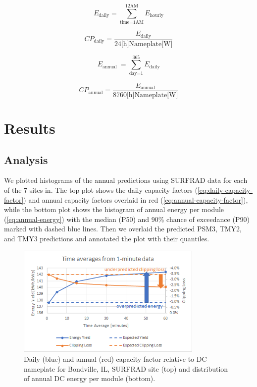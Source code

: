 \documentclass[conference]{IEEEtran}
\begin{document}
\begin{equation}
E_\text{daily} = \sum_\text{time=1AM}^\text{12AM}{E_\text{hourly}} \label{eq:daily-energy}
\end{equation}

\begin{equation}
\mathit{CP}_\text{daily} = \frac{E_\text{daily}}{ 24\text{[h]} \text{Nameplate[W]} } \label{eq:daily-capacity-factor}
\end{equation}

\begin{equation}
E_\text{annual }= \sum_\text{day=1}^\text{365}{E_\text{daily}} \label{eq:annual-energy}
\end{equation}

\begin{equation}
\mathit{CP}_\text{annual} = \frac{E_\text{annual}}{ 8760\text{[h]} \text{Nameplate[W]} } \label{eq:annual-capacity-factor}
\end{equation}

\section{Results}
\label{section:results}

\subsection{Analysis}
We plotted histograms of the annual predictions using SURFRAD data for each of the 7 sites in. The top plot shows the daily capacity factors (\ref{eq:daily-capacity-factor}) and annual capacity factors overlaid in red (\ref{eq:annual-capacity-factor}), while the bottom plot shows the histogram of annual energy per module (\ref{eq:annual-energy}) with the median (P50) and 90\% chance of exceedance (P90) marked with dashed blue lines. Then we overlaid the predicted PSM3, TMY2, and TMY3 predictions and annotated the plot with their quantiles.

\begin{figure}[htbp]
\centerline{\includegraphics[width=9cm]{time-averaged.png}}
\caption{Daily (blue) and annual (red) capacity factor relative to DC nameplate for Bondville, IL, SURFRAD site (top) and distribution of annual DC energy per module (bottom).}
\label{fig:time-averaged}
\end{figure}
\end{document}
